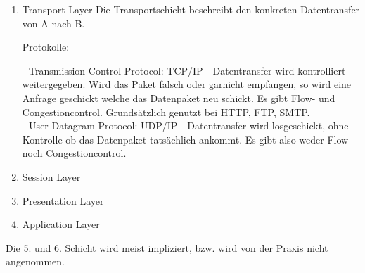 \documentclass[11pt]{article}
\begin{document}
\begin{enumerate}
        \item Transport Layer
        Die Transportschicht beschreibt den konkreten Datentransfer von A nach B.

        Protokolle:
        \begin{addmargin}[1em]{1em}
            - Transmission Control Protocol: TCP/IP - Datentransfer wird kontrolliert weitergegeben. Wird das Paket falsch oder garnicht
            empfangen, so wird eine Anfrage geschickt welche das Datenpaket neu schickt.
            Es gibt Flow- und Congestioncontrol. Grundsätzlich genutzt bei HTTP, FTP, SMTP.\\
            - User Datagram Protocol: UDP/IP - Datentransfer wird losgeschickt, ohne Kontrolle ob das Datenpaket tatsächlich ankommt.
            Es gibt also weder Flow- noch Congestioncontrol.\\
        \end{addmargin}

        \item Session Layer

        \item Presentation Layer

        \item Application Layer

    \end{enumerate}

    Die 5. und 6. Schicht wird meist impliziert, bzw. wird von der Praxis nicht angenommen.
\end{document}
